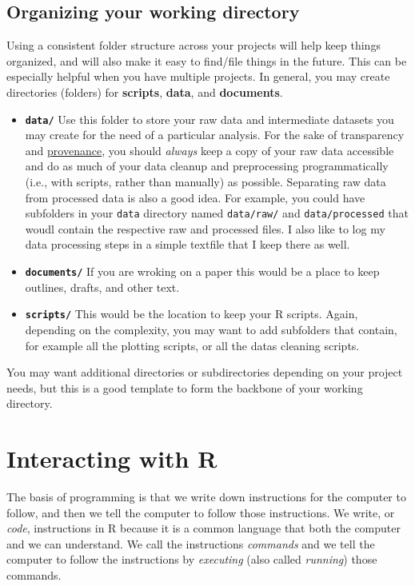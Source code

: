 \documentclass[
]{book}
\providecommand{\tightlist}{%
  \setlength{\itemsep}{0pt}\setlength{\parskip}{0pt}}
\begin{document}
\subsection{Organizing your working directory}\label{organizing-your-working-directory}

Using a consistent folder structure across your projects will help keep things
organized, and will also make it easy to find/file things in the future. This
can be especially helpful when you have multiple projects. In general, you may
create directories (folders) for \textbf{scripts}, \textbf{data}, and \textbf{documents}.

\begin{itemize}
\tightlist
\item
  \textbf{\texttt{data/}} Use this folder to store your raw data and intermediate
  datasets you may create for the need of a particular analysis. For the sake
  of transparency and \href{https://en.wikipedia.org/wiki/Provenance}{provenance},
  you should \emph{always} keep a copy of your raw data accessible and do as much
  of your data cleanup and preprocessing programmatically (i.e., with scripts,
  rather than manually) as possible. Separating raw data from processed data
  is also a good idea. For example, you could have subfolders in your \texttt{data} directory named
  \texttt{data/raw/}
  and \texttt{data/processed} that woudl contain the respective raw and processed files. I also like to log my data processing steps in a simple textfile that I keep there as well.
\item
  \textbf{\texttt{documents/}} If you are wroking on a paper this would be a place to keep outlines, drafts, and other
  text.
\item
  \textbf{\texttt{scripts/}} This would be the location to keep your R scripts. Again, depending on the complexity, you may want to add subfolders that contain, for example all the plotting scripts, or all the datas cleaning scripts.
\end{itemize}

You may want additional directories or subdirectories depending on your project
needs, but this is a good template to form the backbone of your working directory.

\section{Interacting with R}\label{interacting-with-r}

The basis of programming is that we write down instructions for the computer to
follow, and then we tell the computer to follow those instructions. We write, or
\emph{code}, instructions in R because it is a common language that both the computer
and we can understand. We call the instructions \emph{commands} and we tell the
computer to follow the instructions by \emph{executing} (also called \emph{running}) those
commands.
\end{document}
